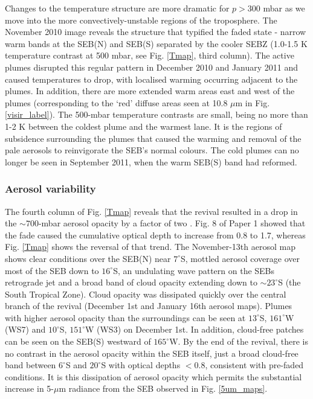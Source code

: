 \documentclass[final,authoryear,5p,times,twocolumn]{elsarticle}
\begin{document}
Changes to the temperature structure are more dramatic for $p>300$ mbar as we move into the more convectively-unstable regions of the troposphere. The November 2010 image reveals the structure that typified the faded state - narrow warm bands at the SEB(N) and SEB(S) separated by the cooler SEBZ (1.0-1.5 K temperature contrast at 500 mbar, see Fig. \ref{Tmap}, third column).  The active plumes disrupted this regular pattern in December 2010 and January 2011 and caused temperatures to drop, with localised warming occurring adjacent to the plumes.  In addition, there are more extended warm areas east and west of the plumes (corresponding to the `red' diffuse areas seen at 10.8 $\mu$m in Fig. \ref{visir_label}).  The 500-mbar temperature contrasts are small, being no more than 1-2 K between the coldest plume and the warmest lane.  It is the regions of subsidence surrounding the plumes that caused the warming and removal of the pale aerosols to reinvigorate the SEB's normal colours.  The cold plumes can no longer be seen in September 2011, when the warm SEB(S) band had reformed.  

\subsubsection{Aerosol variability}
The fourth column of Fig. \ref{Tmap} reveals that the revival resulted in a drop in the $\sim700$-mbar aerosol opacity by a factor of two \citep[assumed to be due to a layer of NH$_3$ ice particles, with optical depths determined at 10 $\mu$m using the refractive indices of][]{84martonchik}.  Fig. 8 of Paper 1 showed that the fade caused the cumulative optical depth to increase from 0.8 to 1.7, whereas Fig. \ref{Tmap} shows the reversal of that trend.  The November-13th aerosol map shows clear conditions over the SEB(N) near $7^\circ$S, mottled aerosol coverage over most of the SEB down to $16^\circ$S, an undulating wave pattern on the SEBs retrograde jet \citep{16rogers_wave} and a broad band of cloud opacity extending down to $\sim23^\circ$S (the South Tropical Zone).  Cloud opacity was dissipated quickly over the central branch of the revival (December 1st and January 16th aerosol maps).  Plumes with higher aerosol opacity than the surroundings can be seen at $13^\circ$S, $161^\circ$W (WS7) and $10^\circ$S, $151^\circ$W (WS3) on December 1st.  In addition, cloud-free patches can be seen on the SEB(S) westward of $165^\circ$W.  By the end of the revival, there is no contrast in the aerosol opacity within the SEB itself, just a broad cloud-free band between $6^\circ$S and $20^\circ$S with optical depths $<0.8$, consistent with pre-faded conditions.  It is this dissipation of aerosol opacity which permits the substantial increase in 5-$\mu$m radiance from the SEB observed in Fig. \ref{5um_maps}.
\end{document}

